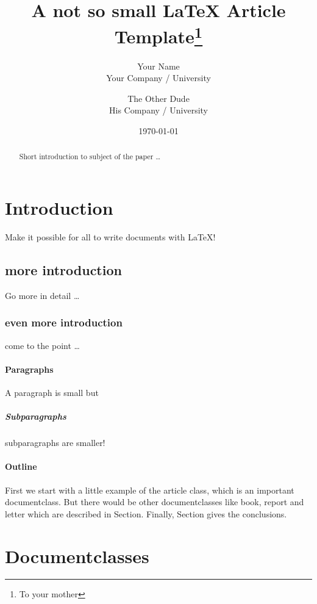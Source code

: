 \documentclass[12pt, a4paper, twoside, titlepage]{article}
\title{A not so small \LaTeX{} Article Template\thanks{To your mother}}
\author{Your Name  \\
	Your Company / University  \\
	\and
	The Other Dude \\
	His Company / University \\
	}
\date{\today}
\begin{document}
\maketitle


\begin{abstract}
Short introduction to subject of the paper \ldots
\end{abstract}

\tableofcontents %

\section{Introduction}
Make it possible for all to write documents with \LaTeX{}!

\subsection{more introduction}
Go more in detail \ldots

\subsubsection{even more introduction}
come to the point \ldots

\paragraph{Paragraphs}
A paragraph is small but

\subparagraph{Subparagraphs}
subparagraphs are smaller!

\paragraph{Outline}
First we start with a little example of the article class, which is an
important documentclass. But there would be other documentclasses like
book, report and letter which are
described in Section. Finally, Section gives the conclusions.



\section{Documentclasses} \label{documentclasses}
\end{document}
